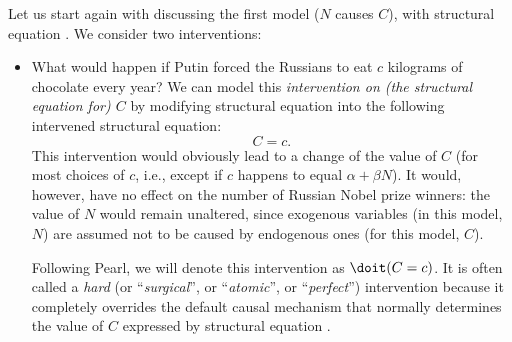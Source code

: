 Let us start again with discussing the first model ($N$ causes $C$), with structural equation .
We consider two interventions:
\begin{itemize}
  \item What would happen if Putin forced the Russians to eat $c$ kilograms of chocolate every year?
    We can model this \emph{intervention on (the structural equation for) $C$} by modifying structural equation  into the following intervened structural equation:
    \begin{equation}\label{eq:scm_N_causes_C_do_C}
    C = c.
    \end{equation}
    This intervention would obviously lead to a change of the value of $C$ (for most choices of $c$, i.e., except if $c$ happens to equal $\alpha + \beta N$). It would, however, have no effect on the number of Russian Nobel prize winners: the value of $N$ would remain unaltered, since exogenous variables (in this model, $N$) are assumed not to be caused by endogenous ones (for this model, $C$).
    
    Following Pearl, we will denote this intervention as $\doit(C=c)$. It is often called a \emph{hard} (or ``\emph{surgical}'', or ``\emph{atomic}'', or ``\emph{perfect}'') intervention because it completely overrides the default causal mechanism that normally determines the value of $C$ expressed by structural equation .


\end{itemize}
